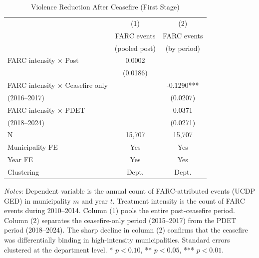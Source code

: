 \begin{table}[H]
\centering
\caption{Violence Reduction After Ceasefire (First Stage)}
\label{tab:violence}
\begin{threeparttable}
\begin{tabular}{lcc}
\toprule
 & (1) & (2) \\
 & FARC events & FARC events \\
 & (pooled post) & (by period) \\
\midrule
FARC intensity $\times$ Post & 0.0002 & \\
 & (0.0186) & \\
FARC intensity $\times$ Ceasefire only & & -0.1290*** \\
\quad (2016--2017) & & (0.0207) \\
FARC intensity $\times$ PDET & & 0.0371 \\
\quad (2018--2024) & & (0.0271) \\
N & 15,707 & 15,707 \\
\midrule
Municipality FE & Yes & Yes \\
Year FE & Yes & Yes \\
Clustering & Dept. & Dept. \\
\bottomrule
\end{tabular}
\begin{tablenotes}[flushleft]
\small
\item \textit{Notes:} Dependent variable is the annual count of FARC-attributed events (UCDP GED) in municipality $m$ and year $t$. Treatment intensity is the count of FARC events during 2010--2014. Column (1) pools the entire post-ceasefire period. Column (2) separates the ceasefire-only period (2015--2017) from the PDET period (2018--2024). The sharp decline in column (2) confirms that the ceasefire was differentially binding in high-intensity municipalities. Standard errors clustered at the department level. * $p<0.10$, ** $p<0.05$, *** $p<0.01$.
\end{tablenotes}
\end{threeparttable}
\end{table}

